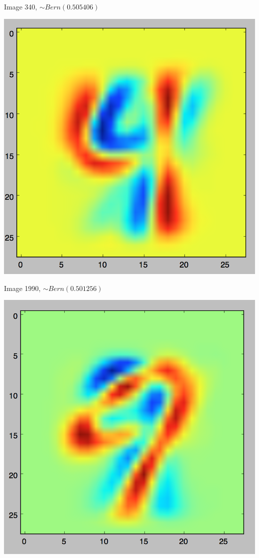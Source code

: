 \documentclass[twoside,11pt]{homework}
\begin{document}
Image 340, $\sim Bern(0.505406)$

\includegraphics[scale=.5]{images/340.png}

Image 1990, $\sim Bern(0.501256)$

\includegraphics[scale=.5]{images/1990.png}
\end{document}
